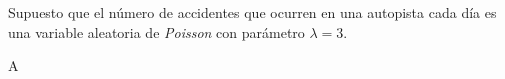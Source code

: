 \question%
	Supuesto que el número de accidentes que ocurren en una autopista cada día es una variable aleatoria de \emph{Poisson} con parámetro $\lambda=3$.

	\begin{solutionordottedlines}
		A
	\end{solutionordottedlines}